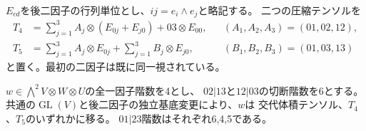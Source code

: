 $E_{cd}$を後二因子の行列単位とし、$ij=e_i\wedge e_j$と略記する。
二つの圧縮テンソルを
\[
 \begin{aligned}
 T_4&=\sum_{j=1}^3 A_j\otimes(E_{0j}+E_{j0})+03\otimes E_{00},
       &&(A_1,A_2,A_3)=(01,02,12),\\
 T_5&=\sum_{j=1}^3 A_j\otimes E_{0j}+\sum_{j=1}^3 B_j\otimes E_{j0},
       &&(B_1,B_2,B_3)=(01,03,13)
 \end{aligned}
\]
と置く。最初の二因子は既に同一視されている。

\begin{theorem}[部分交代四テンソルの三正規形]\label{thm:partially-alternating-three-forms}
$w\in\bigwedge^2V\otimes W\otimes U$の全一因子階数を4とし、
$02|13$と$12|03$の切断階数を6とする。
共通の$\operatorname{GL}(V)$と後二因子の独立基底変更により、$w$は
交代体積テンソル、$T_4$、$T_5$のいずれかに移る。
$01|23$階数はそれぞれ6,4,5である。
\end{theorem}
